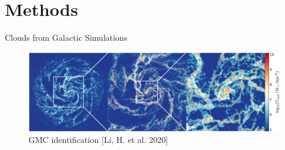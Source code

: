 \documentclass[aspectratio=169]{beamer}
\begin{document}
\section{Methods}
%
%
% 
\begin{frame}{Clouds from Galactic Simulations}
	\begin{figure}[h!]
                \centering
                \includegraphics[width=\linewidth]{../images/AREPO_galaxy.png} \\
                GMC identification [Li, H. et al. 2020]
                \label{fig:arepo_galaxy}
	\end{figure}
\end{frame}
%
%
%
%
%
\end{document}
